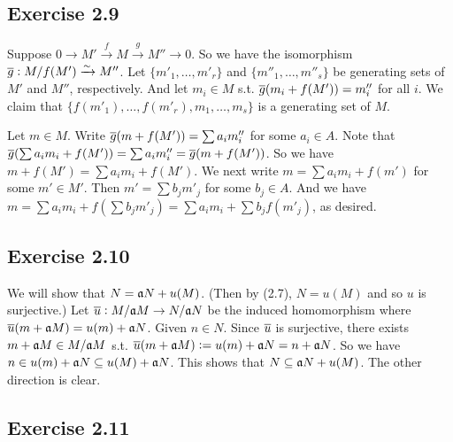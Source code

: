 \documentclass[../A&M.tex]{subfiles}
\begin{document}
\subsection*{Exercise 2.9}

Suppose $0 \to M' \overset{f}{\to} M \overset{g}{\to} M'' \to 0$. So we have the isomorphism $\overline{g}: M/f(M') \xrightarrow{\sim} M''$. Let $\{m'_1,\ldots,m'_r\}$ and $\{m''_1,\ldots,m''_s\}$ be generating sets of $M'$ and $M''$, respectively. And let $m_i \in M$ s.t. $\overline{g}(m_i + f(M')) = m''_i$ for all $i$. We claim that $\{f(m'_1),\ldots,f(m'_r),m_1,\ldots,m_s\}$ is a generating set of $M$.

Let $m\in M$. Write $\overline{g}(m+f(M')) = \sum a_im''_i$ for some $a_i \in A$. Note that $\overline{g}(\sum a_im_i + f(M')) = \sum a_im''_i = \overline{g}(m+f(M'))$. So we have $m+f(M') = \sum a_im_i + f(M')$. We next write $m = \sum a_im_i + f(m')$ for some $m'\in M'$. Then $m' = \sum b_j m'_j$ for some $b_j \in A$. And we have $m = \sum a_im_i + f( \sum b_j m'_j) = \sum a_im_i + \sum b_jf(m'_j)$, as desired.

\subsection*{Exercise 2.10}

We will show that $N = \mathfrak{a} N + u(M)$. (Then by (2.7), $N = u(M)$ and so $u$ is surjective.) Let $\overline{u} : M/\mathfrak{a} M \to N/\mathfrak{a} N$ be the induced homomorphism where $\overline{u}(m+\mathfrak{a} M) = u(m) + \mathfrak{a} N$. Given $n\in N$. Since $\overline{u}$ is surjective, there exists $m+\mathfrak{a} M \in M/\mathfrak{a} M$ s.t. $\overline{u}(m+\mathfrak{a} M) := u(m) + \mathfrak{a} N = n + \mathfrak{a} N$. So we have $n \in u(m) + \mathfrak{a} N \subseteq u(M) + \mathfrak{a} N$. This shows that $N \subseteq \mathfrak{a} N + u(M)$. The other direction is clear.

\subsection*{Exercise 2.11}

\begin{comment}
Take a maximal ideal $\mfk$ of $A$. Note that by (2.14),
$$
A^n \otimes_A (A/\mfk) = (\oplus_{i=1}^n A) \otimes_A (A/\mfk) \simeq \oplus_{i=1}^n (A \otimes_A (A/\mfk)) \simeq \oplus_{i=1}^n A/\mfk
$$
So by tensoring $A/\mfk$ to the isomorphism $A^n \simeq A^m$, we have $\oplus_{i=1}^n A/\mfk \simeq \oplus_{i=1}^m A/\mfk$. And this implies $n=m$ as they are isomorphic as vector spaces.
\end{comment}
\end{document}

